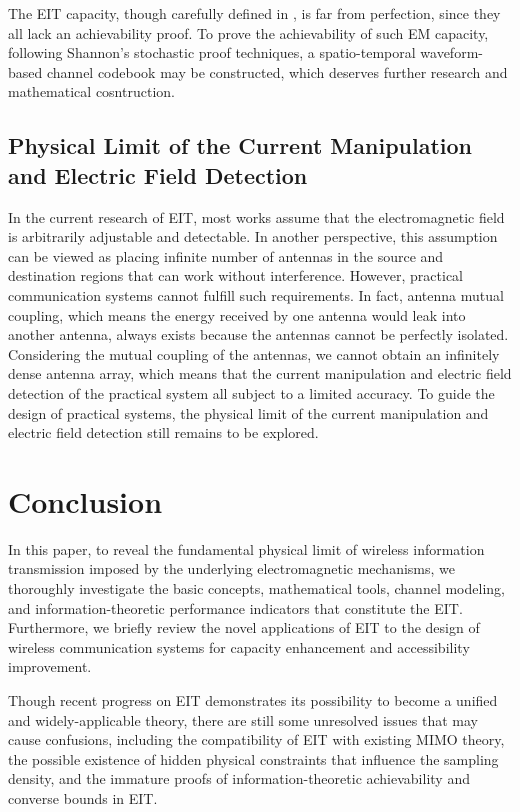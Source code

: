 \documentclass[journal,twocolumn]{IEEEtran}
\begin{document}
The EIT capacity, though carefully defined in \cite{wan2022mutual,zhang2022pdma}, is far from perfection, since they all lack an achievability proof. 
To prove the achievability of such EM capacity, following Shannon's stochastic proof techniques, a spatio-temporal waveform-based channel codebook may be constructed, which deserves further research and mathematical cosntruction.  

\subsection{Physical Limit of the Current Manipulation and Electric Field Detection}
In the current research of EIT, most works assume that the electromagnetic field is arbitrarily adjustable and detectable. In another perspective, this assumption can be viewed as placing infinite number of antennas in the source and destination regions that can work without interference. However, practical communication systems cannot fulfill such requirements. In fact, antenna mutual coupling, which means the energy received by one antenna would leak into another antenna, always exists because the antennas cannot be perfectly isolated. Considering the mutual coupling of the antennas, we cannot obtain an infinitely dense antenna array, which means that the current manipulation and electric field detection of the practical system all subject to a limited accuracy. To guide the design of practical systems, the physical limit of the current manipulation and electric field detection still remains to be explored. 

\section{Conclusion}
In this paper, to reveal the fundamental physical limit of wireless information transmission imposed by the underlying electromagnetic mechanisms, we thoroughly investigate the basic concepts, mathematical tools, channel modeling, and information-theoretic performance indicators that constitute the EIT. 
Furthermore, we briefly review the novel applications of EIT to the design of wireless communication systems for capacity enhancement and accessibility improvement. 

Though recent progress on EIT demonstrates its possibility to become a unified and widely-applicable theory, there are still some unresolved issues that may cause confusions, including the compatibility of EIT with existing MIMO theory, the possible existence of hidden physical constraints that influence the sampling density, and the immature proofs of information-theoretic achievability and converse bounds in EIT. 
\end{document}
